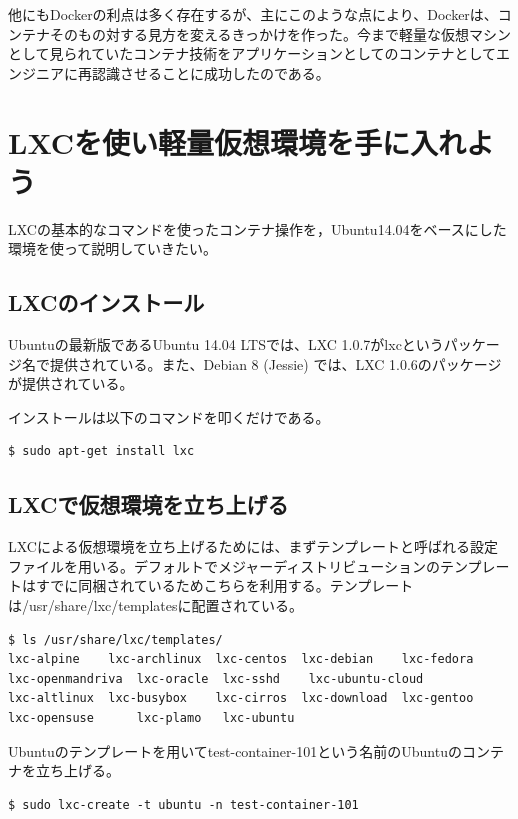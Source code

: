 ﻿\documentclass[9pt,b5paper,tombo,openany]{jsbook}
\begin{document}
他にもDockerの利点は多く存在するが、主にこのような点により、Dockerは、コンテナそのもの対する見方を変えるきっかけを作った。今まで軽量な仮想マシンとして見られていたコンテナ技術をアプリケーションとしてのコンテナとしてエンジニアに再認識させることに成功したのである。

\newpage

\section{LXCを使い軽量仮想環境を手に入れよう}
LXCの基本的なコマンドを使ったコンテナ操作を，Ubuntu14.04をベースにした環境を使って説明していきたい。

\subsection{LXCのインストール}
Ubuntuの最新版であるUbuntu 14.04 LTSでは、LXC 1.0.7がlxcというパッケージ名で提供されている。また、Debian 8 (Jessie) では、LXC 1.0.6のパッケージが提供されている。

\noindent
インストールは以下のコマンドを叩くだけである。

\begin{lstlisting}
$ sudo apt-get install lxc
\end{lstlisting}

\subsection{LXCで仮想環境を立ち上げる}
LXCによる仮想環境を立ち上げるためには、まずテンプレートと呼ばれる設定ファイルを用いる。デフォルトでメジャーディストリビューションのテンプレートはすでに同梱されているためこちらを利用する。テンプレートは/usr/share/lxc/templatesに配置されている。

\begin{lstlisting}
$ ls /usr/share/lxc/templates/
lxc-alpine    lxc-archlinux  lxc-centos  lxc-debian    lxc-fedora  lxc-openmandriva  lxc-oracle  lxc-sshd    lxc-ubuntu-cloud
lxc-altlinux  lxc-busybox    lxc-cirros  lxc-download  lxc-gentoo  lxc-opensuse      lxc-plamo	 lxc-ubuntu
\end{lstlisting}

\noindent
Ubuntuのテンプレートを用いてtest-container-101という名前のUbuntuのコンテナを立ち上げる。

\begin{lstlisting}
$ sudo lxc-create -t ubuntu -n test-container-101
\end{lstlisting}
\end{document}
